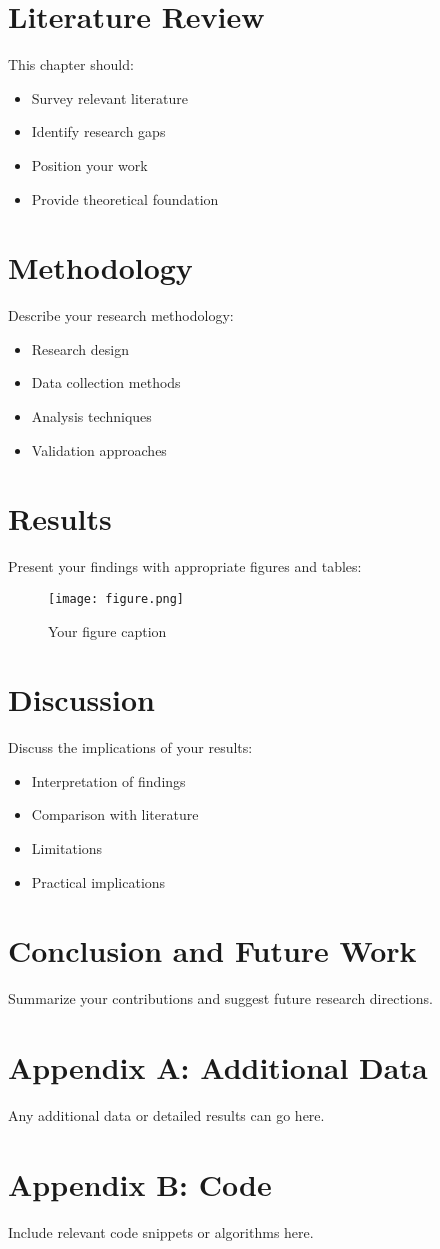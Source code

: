 \documentclass[12pt]{report}
\begin{document}
\chapter{Literature Review}
This chapter should:
\begin{itemize}
    \item Survey relevant literature
    \item Identify research gaps
    \item Position your work
    \item Provide theoretical foundation
\end{itemize}

\chapter{Methodology}
Describe your research methodology:
\begin{itemize}
    \item Research design
    \item Data collection methods
    \item Analysis techniques
    \item Validation approaches
\end{itemize}

\chapter{Results}
Present your findings with appropriate figures and tables:

\begin{figure}[h]
\centering
\texttt{[image: figure.png]}
\caption{Your figure caption}
\label{fig:example}
\end{figure}

\chapter{Discussion}
Discuss the implications of your results:
\begin{itemize}
    \item Interpretation of findings
    \item Comparison with literature
    \item Limitations
    \item Practical implications
\end{itemize}

\chapter{Conclusion and Future Work}
Summarize your contributions and suggest future research directions.




\appendix
\chapter{Appendix A: Additional Data}
Any additional data or detailed results can go here.

\chapter{Appendix B: Code}
Include relevant code snippets or algorithms here.
\end{document}
